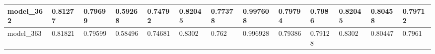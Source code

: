 \begin{tabular}{|l|l|l|l|l|l|l|l|l|l|l|l|l|}
model\_362     & 0.81277     & 0.79699        & 0.59268      & 0.74792          & 0.82045              & 0.77378              & 0.997608     & 0.79794           & 0.7986             & 0.82045         & 0.80458     & 0.79712      \\ \hline
model\_363     & 0.81821     & 0.79599        & 0.58496      & 0.74681          & 0.8302               & 0.762                & 0.996928     & 0.79386           & 0.79128            & 0.8302          & 0.80447     & 0.7961       \\ \hline
\end{tabular}